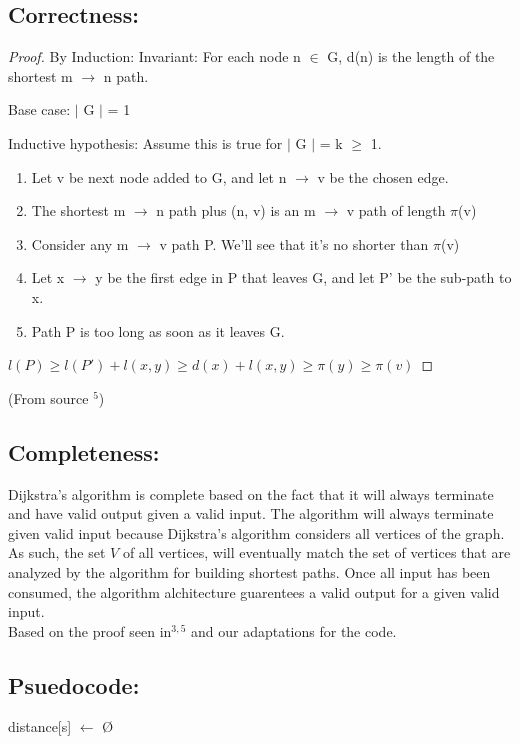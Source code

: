 \documentclass{article}
\begin{document}
\subsection{Correctness:} 
\begin{proof}
By Induction:
Invariant: For each node n $\in$ G, d(n) is the length of the shortest m $\rightarrow$ n path.

Base case: $\mid$ G $\mid$  = 1

Inductive hypothesis: Assume this is true for $\mid$ G $\mid$ = k $\geq$ 1.
\begin{enumerate}
\item Let v be next node added to G, and let n $\rightarrow$ v be the chosen edge.
\item The shortest m $\rightarrow$ n path plus (n, v) is an m $\rightarrow$ v path of length $\pi$(v)
\item Consider any m $\rightarrow$ v path P.
    We'll see that it's no shorter than $\pi$(v)
\item Let x $\rightarrow$ y be the first edge in P that leaves G, 
    and let P' be the sub-path to x.
\item Path P is too long as soon as it leaves G.
\end{enumerate}
\hspace{10 pt}$l(P) \geq l(P') + l(x,y) \geq d(x) + l(x,y) \geq \pi(y) \geq \pi(v)$
\end{proof}
(From source $^5$)

\subsection{Completeness:}
Dijkstra's algorithm is complete based on the fact that it will always terminate and have valid output given a valid input.
The algorithm will always terminate given valid input because Dijkstra's algorithm considers all vertices of the graph. As such, the set $V$ of all vertices, will eventually match the set of vertices that are analyzed by the algorithm for building shortest paths.  Once all input has been consumed, the algorithm alchitecture guarentees a valid output for a given valid input.
\\Based on the proof seen in$^{3,5}$ and our adaptations for the code.

\subsection{Psuedocode:}

distance[s] $\leftarrow$ \O
\end{document}

